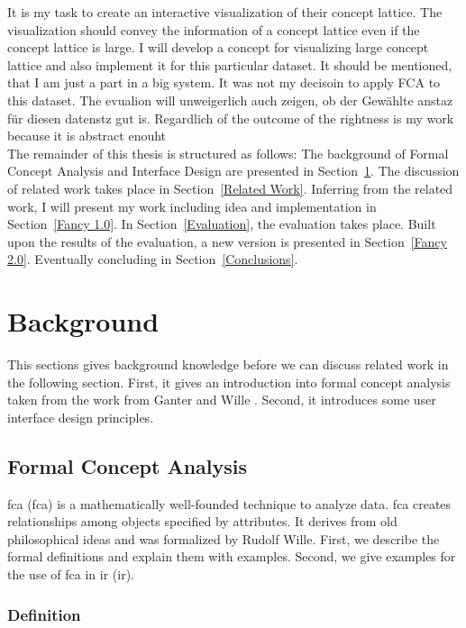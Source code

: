 \documentclass[11pt]{report}
\begin{document}
It is my task to create an interactive visualization of their concept lattice. The visualization should convey the information of a concept lattice even if the concept lattice is large. I will develop a concept for visualizing large concept lattice and also implement it for this particular dataset. It should be mentioned, that I am just a part in a big system. It was not my decisoin to apply FCA to this dataset. The evualion will unweigerlich auch zeigen, ob der Gewählte anstaz für diesen datenstz gut is. Regardlich of the outcome of the rightness is my work because it is abstract enouht\\

 The remainder of this thesis is structured as follows: The background of Formal Concept Analysis and Interface Design are presented in Section~\ref{Background}. The discussion of related work takes place in Section~\ref{Related Work}. Inferring from the related work, I will present my work including idea and implementation in Section~\ref{Fancy 1.0}. In Section~\ref{Evaluation}, the evaluation takes place. Built upon the results of the evaluation, a new version is presented in Section~\ref{Fancy 2.0}. Eventually concluding in Section~\ref{Conclusions}.
 
\chapter{Background}
\label{Background}

This sections gives background knowledge before we can discuss related work in the following section. First, it gives an introduction into formal concept analysis taken from the work from Ganter and Wille \cite{Ganter2012}. Second, it introduces some user interface design principles.

\section{Formal Concept Analysis}
\label{Formal Concept Analysis}

\acrlong{fca} (\acrshort{fca}) is a mathematically well-founded technique to analyze data. \acrshort{fca} creates relationships among objects specified by attributes. It derives from old philosophical ideas and was formalized by Rudolf Wille. First, we describe the formal definitions and explain them with examples. Second, we give examples for the use of \acrshort{fca} in \acrlong{ir} (\acrshort{ir}).

\subsection{Definition}
\end{document}
